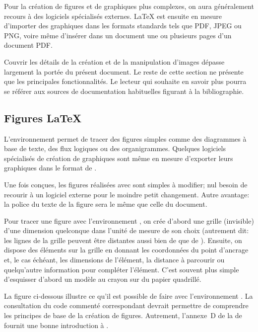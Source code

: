 Pour la création de figures et de graphiques plus complexes, on aura généralement
recours à des logiciels spécialisés externes. {\LaTeX} est ensuite en
mesure d'importer des graphiques dans les formats standards tels que PDF, JPEG
ou PNG, voire même d'insérer dans un document une ou plusieurs pages
d'un document PDF.

Couvrir les détails de la création et de la manipulation d'images
dépasse largement la portée du présent document. Le reste de cette
section ne présente que les principales fonctionnalités. Le lecteur
qui souhaite en savoir plus pourra se référer aux sources de documentation habituelles figurant à la
bibliographie.


\subsection{Figures {\LaTeX}}
\label{sec:tableaux:figures:picture}

L'environnement  permet de tracer des figures simples
comme des diagrammes à base de texte, des flux logiques ou des
organigrammes. Quelques logiciels spécialisés de création de
graphiques sont même en mesure d'exporter leurs graphiques dans le
format de .

Une fois conçues, les figures réalisées avec  sont
simples à modifier; nul besoin de recourir à un logiciel externe pour
le moindre petit changement. Autre avantage: la police du texte
de la figure sera le même que celle du document.

Pour tracer une figure avec l'environnement , on crée
d'abord une grille (invisible) d'une dimension quelconque dans l'unité
de mesure de son choix (autrement dit: les lignes de la grille
peuvent être distantes aussi bien de \code{1pt} que de \code{1cm}).
Ensuite, on dispose des éléments sur la grille en donnant les
coordonnées du point d'ancrage et, le cas échéant, les dimensions de
l'élément, la distance à parcourir ou quelqu'autre information pour
compléter l'élément. C'est souvent plus simple d'esquisser d'abord un modèle au
crayon sur du papier quadrillé.

La figure ci-dessous illustre ce qu'il est possible de faire avec
l'environnement . La consultation du code commenté
correspondant devrait permettre de comprendre les principes de base de
la création de figures. Autrement, l'annexe~D de la %
de  fournit une bonne introduction à .

